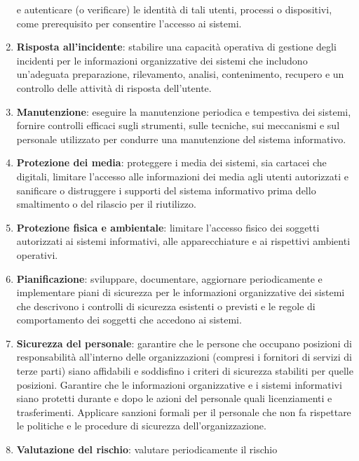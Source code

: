 \begin{enumerate}
            e autenticare (o verificare) le identità di tali utenti, processi o
            dispositivi, come prerequisito per consentire l'accesso ai sistemi.
      \item \textbf{Risposta all'incidente}: stabilire una capacità operativa
            di gestione degli incidenti per le informazioni organizzative dei sistemi
            che includono un'adeguata preparazione, rilevamento, analisi, contenimento,
            recupero e un controllo delle attività di risposta dell'utente.
      \item \textbf{Manutenzione}: eseguire la manutenzione periodica e
            tempestiva dei sistemi, fornire controlli efficaci sugli strumenti,
            sulle tecniche, sui meccanismi e sul personale utilizzato per condurre
            una manutenzione del sistema informativo.
      \item \textbf{Protezione dei media}: proteggere i media dei sistemi, sia
            cartacei che digitali, limitare l'accesso alle informazioni dei media agli
            utenti autorizzati e sanificare o distruggere i supporti del sistema
            informativo prima dello smaltimento o del rilascio per il riutilizzo.
      \item \textbf{Protezione fisica e ambientale}: limitare l'accesso fisico
            dei soggetti autorizzati ai sistemi informativi, alle apparecchiature e ai
            rispettivi ambienti operativi.
      \item \textbf{Pianificazione}: sviluppare, documentare, aggiornare
            periodicamente e implementare piani di sicurezza per le informazioni
            organizzative dei sistemi che descrivono i controlli di sicurezza esistenti
            o previsti e le regole di comportamento dei soggetti che accedono ai sistemi.
      \item \textbf{Sicurezza del personale}: garantire che le persone che occupano
            posizioni di responsabilità all'interno delle organizzazioni
            (compresi i fornitori di servizi di terze parti) siano affidabili e
            soddisfino i criteri di sicurezza stabiliti per quelle posizioni.
            Garantire che le informazioni organizzative e i sistemi informativi siano
            protetti durante e dopo le azioni del personale quali licenziamenti e
            trasferimenti. Applicare sanzioni formali per il personale che non fa
            rispettare le politiche e le procedure di sicurezza dell'organizzazione.
      \item \textbf{Valutazione del rischio}: valutare periodicamente il rischio

\end{enumerate}
